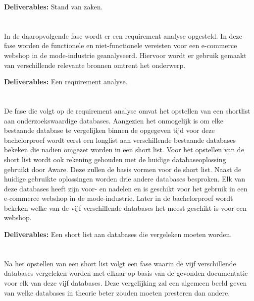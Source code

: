 \textbf{Deliverables:} Stand van zaken.

\section{}%
\label{sec:analysis}

In de daaropvolgende fase wordt er een requirement analyse opgesteld. In deze fase worden de functionele en niet-functionele vereisten voor een e-commerce webshop in de mode-industrie geanalyseerd. Hiervoor wordt er gebruik gemaakt van verschillende relevante bronnen omtrent het onderwerp. 

\textbf{Deliverables:} Een requirement analyse.

\section{}%
\label{sec:short-list}

De fase die volgt op de requirement analyse omvat het opstellen van een shortlist aan onderzoekswaardige databases. Aangezien het onmogelijk is om elke bestaande database te vergelijken binnen de opgegeven tijd voor deze bachelorproef wordt eerst een longlist aan verschillende bestaande databases bekeken die nadien omgezet worden in een short list. Voor het opstellen van de short list wordt ook rekening gehouden met de huidige databaseoplossing gebruikt door Aware. Deze zullen de basis vormen voor de short list. Naast de huidige gebruikte oplossingen worden drie andere databases besproken. Elk van deze databases heeft zijn voor- en nadelen en is geschikt voor het gebruik in een e-commerce webshop in de mode-industrie. Later in de bachelorproef wordt bekeken welke van de vijf verschillende databases het meest geschikt is voor een webshop. 

\textbf{Deliverables:} Een short list aan databases die vergeleken moeten worden.

\section{}%
\label{sec:studie}

Na het opstellen van een short list volgt een fase waarin de vijf verschillende databases vergeleken worden met elkaar op basis van de gevonden documentatie voor elk van deze vijf databases. Deze vergelijking zal een algemeen beeld geven van welke databases in theorie beter zouden moeten presteren dan andere. 

